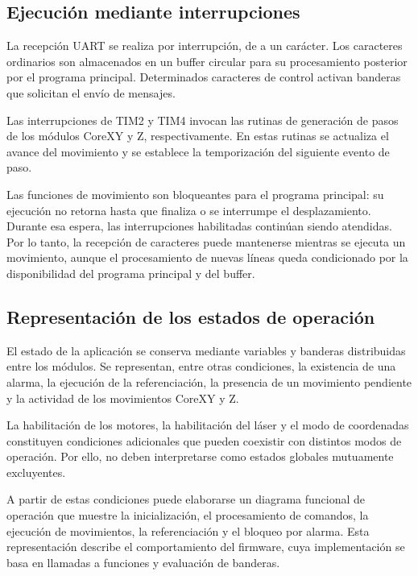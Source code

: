 \documentclass[blue,fullpaper]{ludusofficial}  %
\begin{document}
\subsection{Ejecución mediante interrupciones}

La recepción UART se realiza por interrupción,
de a un carácter. Los caracteres ordinarios
son almacenados en un buffer circular para
su procesamiento posterior por el programa
principal. Determinados caracteres de control
activan banderas que solicitan el envío
de mensajes.

Las interrupciones de TIM2 y TIM4 invocan
las rutinas de generación de pasos de los
módulos CoreXY y Z, respectivamente.
En estas rutinas se actualiza el avance
del movimiento y se establece la temporización
del siguiente evento de paso.

Las funciones de movimiento son bloqueantes
para el programa principal: su ejecución
no retorna hasta que finaliza o se interrumpe
el desplazamiento. Durante esa espera,
las interrupciones habilitadas continúan
siendo atendidas. Por lo tanto, la recepción
de caracteres puede mantenerse mientras
se ejecuta un movimiento, aunque el
procesamiento de nuevas líneas queda
condicionado por la disponibilidad
del programa principal y del buffer.

\subsection{Representación de los estados de operación}

El estado de la aplicación se conserva
mediante variables y banderas distribuidas
entre los módulos. Se representan, entre
otras condiciones, la existencia de una
alarma, la ejecución de la referenciación,
la presencia de un movimiento pendiente
y la actividad de los movimientos
CoreXY y Z.

La habilitación de los motores, la habilitación
del láser y el modo de coordenadas constituyen
condiciones adicionales que pueden coexistir
con distintos modos de operación. Por ello,
no deben interpretarse como estados globales
mutuamente excluyentes.

A partir de estas condiciones puede elaborarse
un diagrama funcional de operación que muestre
la inicialización, el procesamiento de comandos,
la ejecución de movimientos, la referenciación
y el bloqueo por alarma. Esta representación
describe el comportamiento del firmware,
cuya implementación se basa en llamadas
a funciones y evaluación de banderas.
\end{document}
